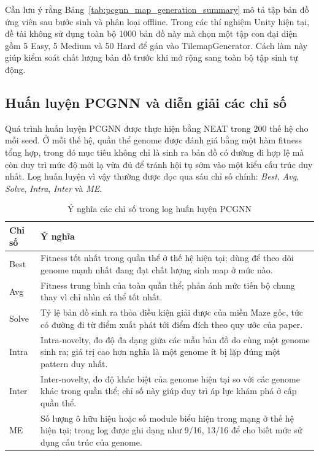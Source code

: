 Cần lưu ý rằng Bảng~\ref{tab:pcgnn_map_generation_summary} mô tả tập bản đồ ứng viên sau bước sinh và phân loại offline. Trong các thí nghiệm Unity hiện tại, đề tài không sử dụng toàn bộ 1000 bản đồ này mà chọn một tập con đại diện gồm 5 Easy, 5 Medium và 50 Hard để gán vào TilemapGenerator. Cách làm này giúp kiểm soát chất lượng bản đồ trước khi mở rộng sang toàn bộ tập sinh tự động.

\subsection{Huấn luyện PCGNN và diễn giải các chỉ số}

Quá trình huấn luyện PCGNN được thực hiện bằng NEAT trong 200 thế hệ cho mỗi seed. Ở mỗi thế hệ, quần thể genome được đánh giá bằng một hàm fitness tổng hợp, trong đó mục tiêu không chỉ là sinh ra bản đồ có đường đi hợp lệ mà còn duy trì mức độ mới lạ vừa đủ để tránh hội tụ sớm vào một kiểu cấu trúc duy nhất. Log huấn luyện vì vậy thường được đọc qua sáu chỉ số chính: \textit{Best}, \textit{Avg}, \textit{Solve}, \textit{Intra}, \textit{Inter} và \textit{ME}.

\begin{table}[H]
    \centering
    \small
    \caption{Ý nghĩa các chỉ số trong log huấn luyện PCGNN}
    \label{tab:pcgnn_training_metrics}
    \begin{tabular}{|p{2.2cm}|p{10.6cm}|}
        \hline
        \textbf{Chỉ số} & \textbf{Ý nghĩa} \\
        \hline
        Best & Fitness tốt nhất trong quần thể ở thế hệ hiện tại; dùng để theo dõi genome mạnh nhất đang đạt chất lượng sinh map ở mức nào. \\
        \hline
        Avg & Fitness trung bình của toàn quần thể; phản ánh mức tiến bộ chung thay vì chỉ nhìn cá thể tốt nhất. \\
        \hline
        Solve & Tỷ lệ bản đồ sinh ra thỏa điều kiện giải được của miền Maze gốc, tức có đường đi từ điểm xuất phát tới điểm đích theo quy ước của paper. \\
        \hline
        Intra & Intra-novelty, đo độ đa dạng giữa các mẫu bản đồ do cùng một genome sinh ra; giá trị cao hơn nghĩa là một genome ít bị lặp đúng một pattern duy nhất. \\
        \hline
        Inter & Inter-novelty, đo độ khác biệt của genome hiện tại so với các genome khác trong quần thể; chỉ số này giúp duy trì áp lực khám phá ở cấp quần thể. \\
        \hline
        ME & Số lượng ô hữu hiệu hoặc số module biểu hiện trong mạng ở thế hệ hiện tại; trong log được ghi dạng như 9/16, 13/16 để cho biết mức sử dụng cấu trúc của genome. \\
        \hline
    \end{tabular}
\end{table}


